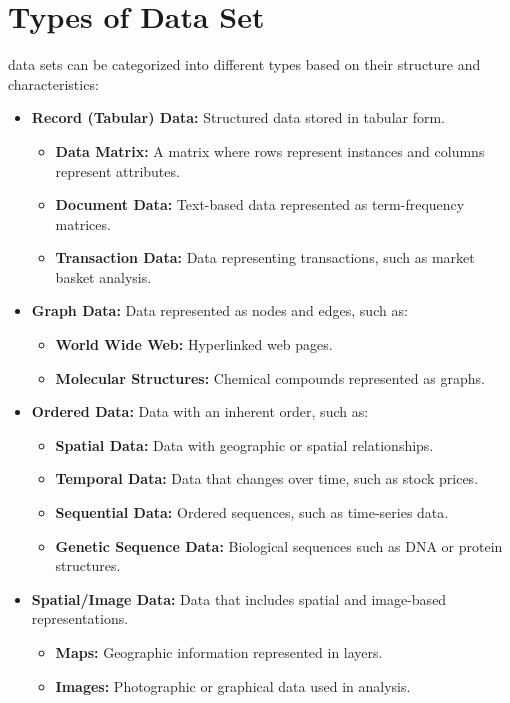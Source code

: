 \documentclass[a4paper,12pt]{article}
\begin{document}
\section{Types of Data Set}
data sets can be categorized into different types based on their structure and characteristics:

\begin{itemize}
    \item \textbf{Record (Tabular) Data:} Structured data stored in tabular form.
    \begin{itemize}
        \item \textbf{Data Matrix:} A matrix where rows represent instances and columns represent attributes.
        \item \textbf{Document Data:} Text-based data represented as term-frequency matrices.
        \item \textbf{Transaction Data:} Data representing transactions, such as market basket analysis.
    \end{itemize}
    \item \textbf{Graph Data:} Data represented as nodes and edges, such as:
    \begin{itemize}
        \item \textbf{World Wide Web:} Hyperlinked web pages.
        \item \textbf{Molecular Structures:} Chemical compounds represented as graphs.
    \end{itemize}
    \item \textbf{Ordered Data:} Data with an inherent order, such as:
    \begin{itemize}
        \item \textbf{Spatial Data:} Data with geographic or spatial relationships.
        \item \textbf{Temporal Data:} Data that changes over time, such as stock prices.
        \item \textbf{Sequential Data:} Ordered sequences, such as time-series data.
        \item \textbf{Genetic Sequence Data:} Biological sequences such as DNA or protein structures.
    \end{itemize}

    \item \textbf{Spatial/Image Data:} Data that includes spatial and image-based representations.
	 \begin{itemize}
	        \item \textbf{Maps:} Geographic information represented in layers.
	        \item \textbf{Images:} Photographic or graphical data used in analysis.
	  \end{itemize}
\end{itemize}
\end{document}
